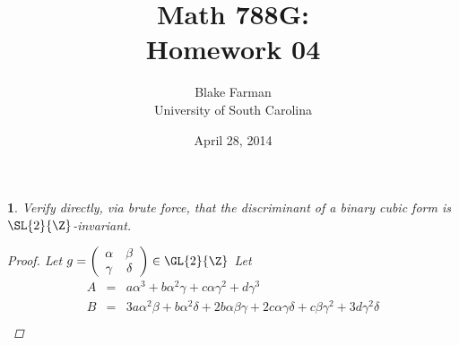 \documentclass[10pt]{amsart}
\author{Blake Farman\\University of South Carolina}
\title{Math 788G:\\Homework 04}
\date{April 28, 2014}
\begin{document}
\maketitle

\providecommand{\p}{\mathfrak{p}}
\providecommand{\m}{\mathfrak{m}}
\providecommand{\Deck}[1]{\operatorname{Deck}\left(#1\right)}
\newtheorem{thm}{}
\newtheorem{lem}{Lemma}
\newtheorem{prop}{Proposition}
\theoremstyle{definition}
\newtheorem{defn}{Definition}[thm]

\newcommand{\A}{\mathbb{A}}

\begin{thm}\label{Ex1}
  Verify directly, via brute force, that the discriminant of a binary cubic form is $\SL{2}{\Z}$-invariant.
  \begin{proof}
    Let $g = \left(\begin{array}{cc} \alpha & \beta \\ \gamma & \delta\end{array}\right) \in \GL{2}{\Z}$
      Let
      \begin{eqnarray*}
        A &=& a\alpha^{3} 
        + b \alpha^{2} \gamma 
        + c \alpha  \gamma^{2} 
        + d \gamma^{3}\\ 
        B &=& 3 a \alpha^{2} \beta 
        + b \alpha^{2}  \delta 
        + 2 b \alpha \beta \gamma 
        + 2 c \alpha \gamma \delta 
        + c \beta \gamma^{2} 
        + 3 d \gamma^{2} \delta\\

\end{eqnarray*}
\end{proof}
\end{thm}
\end{document}
